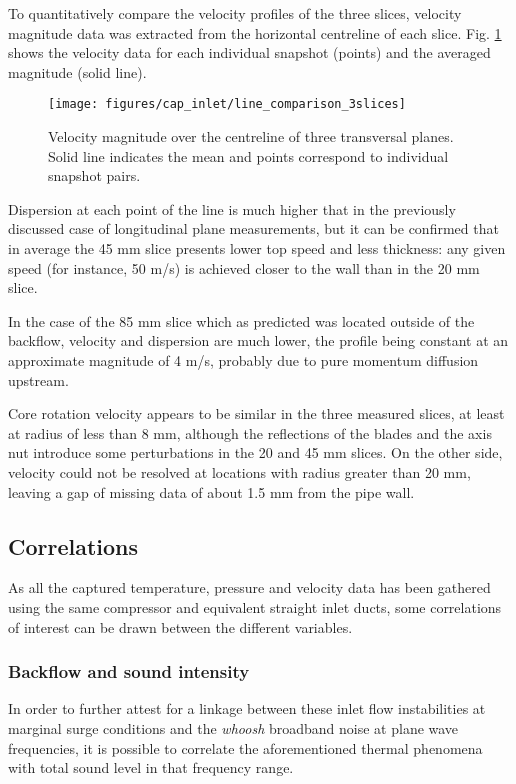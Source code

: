 To quantitatively compare the velocity profiles of the three slices, velocity magnitude data was extracted from the horizontal centreline of each slice. Fig. \ref{fig:line_comp_3slices} shows the velocity data for each individual snapshot (points) and the averaged magnitude (solid line).

\begin{figure}[htb!]
\centering
\texttt{[image: figures/cap\_inlet/line\_comparison\_3slices]}
\caption{Velocity magnitude over the centreline of three transversal planes. Solid line indicates the mean and points correspond to individual snapshot pairs.}
\label{fig:line_comp_3slices}
\end{figure}

Dispersion at each point of the line is much higher that in the previously discussed case of longitudinal plane measurements, but it can be confirmed that in average the 45 mm slice presents lower top speed and less thickness: any given speed (for instance, 50 m/s) is achieved closer to the wall than in the 20 mm slice.

In the case of the 85 mm slice which as predicted was located outside of the backflow, velocity and dispersion are much lower, the profile being constant at an approximate magnitude of 4 m/s, probably due to pure momentum diffusion upstream.

Core rotation velocity appears to be similar in the three measured slices, at least at radius of less than 8 mm, although the reflections of the blades and the axis nut introduce some perturbations in the 20 and 45 mm slices. On the other side, velocity could not be resolved at locations with radius greater than 20 mm, leaving a gap of missing data of about 1.5 mm from the pipe wall.

\subsection{Correlations}

As all the captured temperature, pressure and velocity data has been gathered using the same compressor and equivalent straight inlet ducts, some correlations of interest can be drawn between the different variables.

\subsubsection{Backflow and sound intensity}

In order to further attest for a linkage between these inlet flow instabilities at marginal surge conditions and the \emph{whoosh} broadband noise at plane wave frequencies, it is possible to correlate the aforementioned thermal phenomena with total sound level in that frequency range.

